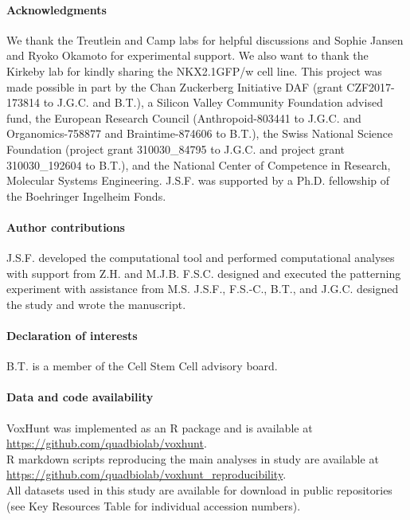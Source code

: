 \paragraph{Acknowledgments}
We thank the Treutlein and Camp labs for helpful discussions and Sophie Jansen and Ryoko Okamoto for experimental support. We also want to thank the Kirkeby lab for kindly sharing the NKX2.1GFP/w cell line. This project was made possible in part by the Chan Zuckerberg Initiative DAF (grant CZF2017-173814 to J.G.C. and B.T.), a Silicon Valley Community Foundation advised fund, the European Research Council (Anthropoid-803441 to J.G.C. and Organomics-758877 and Braintime-874606 to B.T.), the Swiss National Science Foundation (project grant 310030\_84795 to J.G.C. and project grant 310030\_192604 to B.T.), and the National Center of Competence in Research, Molecular Systems Engineering. J.S.F. was supported by a Ph.D. fellowship of the Boehringer Ingelheim Fonds.

\paragraph{Author contributions}
J.S.F. developed the computational tool and performed computational analyses with support from Z.H. and M.J.B. F.S.C. designed and executed the patterning experiment with assistance from M.S. J.S.F., F.S.-C., B.T., and J.G.C. designed the study and wrote the manuscript.

\paragraph{Declaration of interests}
B.T. is a member of the Cell Stem Cell advisory board.

\paragraph{Data and code availability}
VoxHunt was implemented as an R package and is available at\\\href{https://github.com/quadbiolab/voxhunt}{https://github.com/quadbiolab/voxhunt}. \\
R markdown scripts reproducing the main analyses in study are available at\\ 
\href{https://github.com/quadbiolab/voxhunt_reproducibility}{https://github.com/quadbiolab/voxhunt\_reproducibility}.\\
All datasets used in this study are available for download in public repositories (see Key Resources Table for individual accession numbers). 

